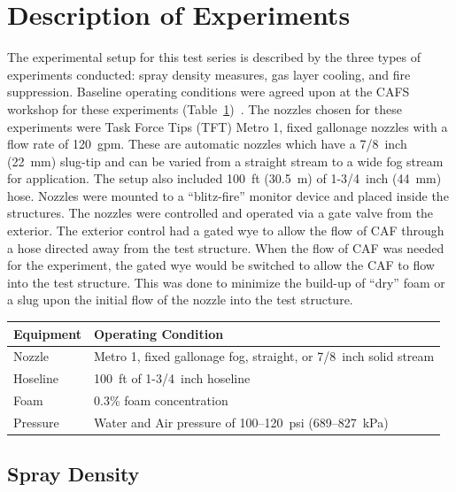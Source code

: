 \documentclass[12pt,oneside]{book}
\begin{document}
\section{Description of Experiments}
\label{sec:desc_experiments}
The experimental setup for this test series is described by the three types of experiments conducted: spray density measures, gas layer cooling, and fire suppression.  Baseline operating conditions were agreed upon at the CAFS workshop for these experiments (Table~\ref{tab:op_condition})~\cite{Grant:2011}. The nozzles chosen for these experiments were Task Force Tips (TFT) Metro 1, fixed gallonage nozzles with a flow rate of 120~gpm. These are automatic nozzles which have a 7/8~inch (22~mm) slug-tip and can be varied from a straight stream to a wide fog stream for application. The setup also included 100~ft (30.5~m) of 1-3/4~inch (44~mm) hose. Nozzles were mounted to a ``blitz-fire'' monitor device and placed inside the structures. The nozzles were controlled and operated via a gate valve from the exterior. The exterior control had a gated wye to allow the flow of CAF through a hose directed away from the test structure. When the flow of CAF was needed for the experiment, the gated wye would be switched to allow the CAF to flow into the test structure. This was done to minimize the build-up of ``dry'' foam or a slug upon the initial flow of the nozzle into the test structure.

\begin{table}[!ht]
\centering
{}\label{tab:op_condition}
\begin{tabular}{ll}
\toprule[1.5pt]
Equipment    &   Operating Condition \\
\midrule
Nozzle       & Metro 1, fixed gallonage fog, straight, or 7/8~inch solid stream \\
Hoseline     & 100~ft of 1-3/4~inch hoseline \\
Foam         & 0.3\% foam concentration \\
Pressure     & Water and Air pressure of 100--120~psi (689--827~kPa)\\
\bottomrule[1.25pt]
\end{tabular}\par
\end{table}


\subsection{Spray Density}
\label{sec:desc_Spray_Density}
\end{document}
